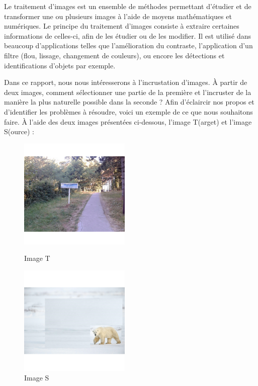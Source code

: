 
Le traitement d'images est un ensemble de méthodes permettant d'étudier et de transformer une ou plusieurs images à l'aide de moyens mathématiques et numériques. Le principe du traitement d'images consiste à extraire certaines informations de celles-ci, afin de les étudier ou de les modifier. Il est utilisé dans beaucoup d'applications telles que l'amélioration du contraste, l'application d'un filtre (flou, lissage, changement de couleurs), ou encore les détections et identifications d'objets par exemple. 

Dans ce rapport, nous nous intéresserons à l'incrustation d'images. À partir de deux images, comment sélectionner une partie de la première et l'incruster de la manière la plus naturelle possible dans la seconde ? 
\newline
Afin d'éclaircir nos propos et d'identifier les problèmes à résoudre, voici un exemple de ce que nous souhaitons faire.\newline
À l'aide des deux images présentées ci-dessous, l'image T(arget) et l'image S(ource) : 
\newline
\begin{figure}[!htb]
   \begin{minipage}{0.48\textwidth}
     \centering
     \includegraphics[width = 150pt]{Annexe/OursT.png}
     \caption{Image T}
      \end{minipage}\hfill
   \begin{minipage}{0.48\textwidth}
     \centering
     \includegraphics[width= 150pt]{Annexe/OursS.png}
     \caption{Image S}\label{Fig:Data2}
   \end{minipage}
\end{figure}

